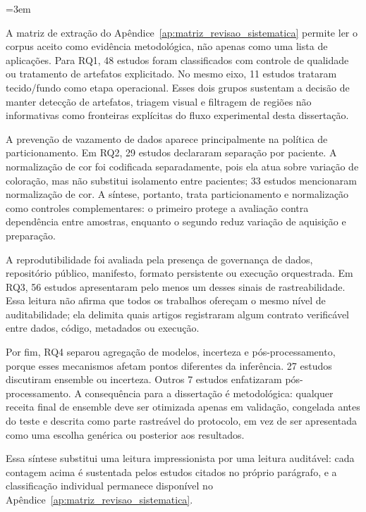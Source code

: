 \begingroup
\emergencystretch=3em
\sloppy

A matriz de extração do Apêndice~\ref{ap:matriz_revisao_sistematica} permite ler o corpus aceito como evidência metodológica, não apenas como uma lista de aplicações. Para RQ1, 48 estudos foram classificados com controle de qualidade ou tratamento de artefatos explicitado. No mesmo eixo, 11 estudos trataram tecido/fundo como etapa operacional. Esses dois grupos sustentam a decisão de manter detecção de artefatos, triagem visual e filtragem de regiões não informativas como fronteiras explícitas do fluxo experimental desta dissertação.

A prevenção de vazamento de dados aparece principalmente na política de particionamento. Em RQ2, 29 estudos declararam separação por paciente. A normalização de cor foi codificada separadamente, pois ela atua sobre variação de coloração, mas não substitui isolamento entre pacientes; 33 estudos mencionaram normalização de cor. A síntese, portanto, trata particionamento e normalização como controles complementares: o primeiro protege a avaliação contra dependência entre amostras, enquanto o segundo reduz variação de aquisição e preparação.

A reprodutibilidade foi avaliada pela presença de governança de dados, repositório público, manifesto, formato persistente ou execução orquestrada. Em RQ3, 56 estudos apresentaram pelo menos um desses sinais de rastreabilidade. Essa leitura não afirma que todos os trabalhos ofereçam o mesmo nível de auditabilidade; ela delimita quais artigos registraram algum contrato verificável entre dados, código, metadados ou execução.

Por fim, RQ4 separou agregação de modelos, incerteza e pós-processamento, porque esses mecanismos afetam pontos diferentes da inferência. 27 estudos discutiram ensemble ou incerteza. Outros 7 estudos enfatizaram pós-processamento. A consequência para a dissertação é metodológica: qualquer receita final de ensemble deve ser otimizada apenas em validação, congelada antes do teste e descrita como parte rastreável do protocolo, em vez de ser apresentada como uma escolha genérica ou posterior aos resultados.

Essa síntese substitui uma leitura impressionista por uma leitura auditável: cada contagem acima é sustentada pelos estudos citados no próprio parágrafo, e a classificação individual permanece disponível no Apêndice~\ref{ap:matriz_revisao_sistematica}.

\fussy
\endgroup
